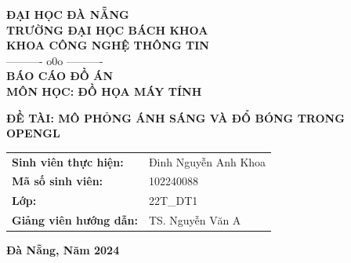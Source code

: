\documentclass[13pt, a4paper]{extarticle}
\begin{document}
\begin{titlepage}
    \begin{center}
        \textbf{\large ĐẠI HỌC ĐÀ NẴNG}\\
        \textbf{\large TRƯỜNG ĐẠI HỌC BÁCH KHOA}\\
        \textbf{\large KHOA CÔNG NGHỆ THÔNG TIN}\\
        ---------- o0o ----------\\
        
        \vspace{4cm}
        \textbf{\Large BÁO CÁO ĐỒ ÁN}\\
        \textbf{\huge MÔN HỌC: ĐỒ HỌA MÁY TÍNH}\\
        
        \vspace{1.5cm}
        \begin{minipage}{0.8\textwidth}
            \centering
            \textbf{\Large ĐỀ TÀI: MÔ PHỎNG ÁNH SÁNG VÀ ĐỔ BÓNG TRONG OPENGL}
        \end{minipage}

        \vspace{4cm}
        \begin{flushright}
            \begin{tabular}{ll}
                \textbf{Sinh viên thực hiện:} & Đinh Nguyễn Anh Khoa \\
                \textbf{Mã số sinh viên:} & 102240088 \\
                \textbf{Lớp:}                 & 22T\_DT1 \\
                \textbf{Giảng viên hướng dẫn:} & TS. Nguyễn Văn A
            \end{tabular}
        \end{flushright}

        \vfill
        \textbf{Đà Nẵng, Năm 2024}
    \end{center}
\end{titlepage}

\newpage
{}
\tableofcontents 

\newpage
\listoffigures

\newpage
\listoftables

\newpage
\end{document}
